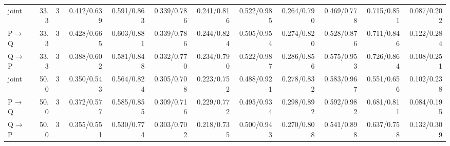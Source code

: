 \documentclass{article}
\begin{document}
\begin{longtable}{lrrrrrrrrrrr}
joint & 33.3 & 3 & 0.412/0.639 & 0.591/0.863 & 0.339/0.786 & 0.241/0.816 & 0.522/0.985 & 0.264/0.790 & 0.469/0.778 & 0.715/0.851 & 0.087/0.202 \\
P$\to$Q & 33.3 & 3 & 0.428/0.665 & 0.603/0.881 & 0.339/0.786 & 0.244/0.824 & 0.505/0.954 & 0.274/0.820 & 0.528/0.876 & 0.711/0.846 & 0.122/0.284 \\
Q$\to$P & 33.3 & 3 & 0.388/0.602 & 0.581/0.848 & 0.332/0.770 & 0.234/0.790 & 0.522/0.987 & 0.286/0.856 & 0.575/0.953 & 0.726/0.864 & 0.108/0.251 \\
joint & 50.0 & 3 & 0.350/0.543 & 0.564/0.824 & 0.305/0.708 & 0.223/0.752 & 0.488/0.921 & 0.278/0.832 & 0.583/0.967 & 0.551/0.656 & 0.102/0.238 \\
P$\to$Q & 50.0 & 3 & 0.372/0.577 & 0.585/0.855 & 0.309/0.716 & 0.229/0.772 & 0.495/0.934 & 0.298/0.892 & 0.592/0.982 & 0.681/0.811 & 0.084/0.195 \\
Q$\to$P & 50.0 & 3 & 0.355/0.551 & 0.530/0.774 & 0.303/0.702 & 0.218/0.735 & 0.500/0.943 & 0.270/0.808 & 0.541/0.898 & 0.637/0.758 & 0.132/0.309 \\
\bottomrule\end{longtable}
\clearpage
\end{document}
